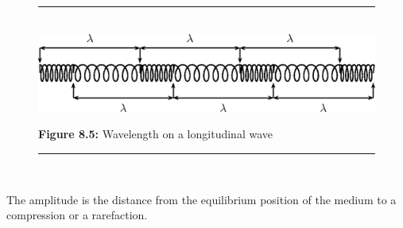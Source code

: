 	\begin{figure}[H] %
    \begin{center}
    \rule[.1in]{\figurerulewidth}{.005in} \\
        \label{m38782*uid9!!!underscore!!!media}\label{m38782*uid9!!!underscore!!!printimage}\includegraphics[width=0.8\columnwidth]{col11305.imgs/m38782_PG11C4_005.png} %
      \vspace{2pt}
    \vspace{\rubberspace}\par \begin{cnxcaption}
	  \small \textbf{Figure 8.5: }Wavelength on a longitudinal wave
	\end{cnxcaption}
    \vspace{.1in}
    \rule[.1in]{\figurerulewidth}{.005in} \\
    \end{center}
 \end{figure}       
        \label{m38782*id292465}The amplitude is the distance from the equilibrium position of the medium to a compression or a rarefaction.\par 
      \label{m38782*uid10}
